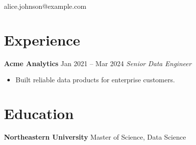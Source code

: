 \documentclass{article}
\begin{document}
\def\name{Alice Johnson}
alice.johnson@example.com

\section{Experience}
\textbf{Acme Analytics} \hfill Jan 2021 -- Mar 2024
\textit{Senior Data Engineer}
\begin{itemize}
\item Built reliable data products for enterprise customers.
\end{itemize}

\section{Education}
\textbf{Northeastern University}
Master of Science, Data Science
\end{document}
